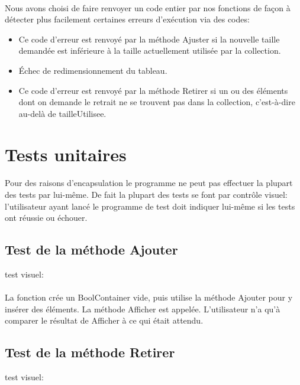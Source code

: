 \documentclass[a4paper, 12pts]{article}
\begin{document}
\paragraph{}
Nous avons choisi de faire renvoyer un code entier par nos fonctions de façon à détecter plus facilement certaines erreurs d’exécution via des codes:
\begin{itemize}
	\item 
Ce code d’erreur est renvoyé par la méthode Ajuster si la nouvelle taille demandée est inférieure à la taille actuellement utilisée par la collection.
	\item 
Échec de redimensionnement du tableau.
	\item 
Ce code d’erreur est renvoyé par la méthode Retirer si un ou des éléments dont on demande le retrait ne se trouvent pas dans la collection, c’est-à-dire au-delà de tailleUtilisee.
\end{itemize}


\section{Tests unitaires}

\paragraph{}
Pour des raisons d'encapsulation le programme ne peut pas effectuer la plupart des tests par lui-même. De fait la plupart des tests se font par contrôle visuel: l'utilisateur ayant lancé le programme de test doit indiquer lui-même si les tests ont réussie ou échouer.

\subsection{Test de la méthode Ajouter}
test visuel:
\paragraph{}
La fonction crée un BoolContainer vide, puis utilise la méthode Ajouter pour y insérer des éléments. La méthode Afficher est appelée. L’utilisateur n’a qu’à comparer le résultat de Afficher à ce qui était attendu.

\subsection{Test de la méthode Retirer}
test visuel:
\end{document}
